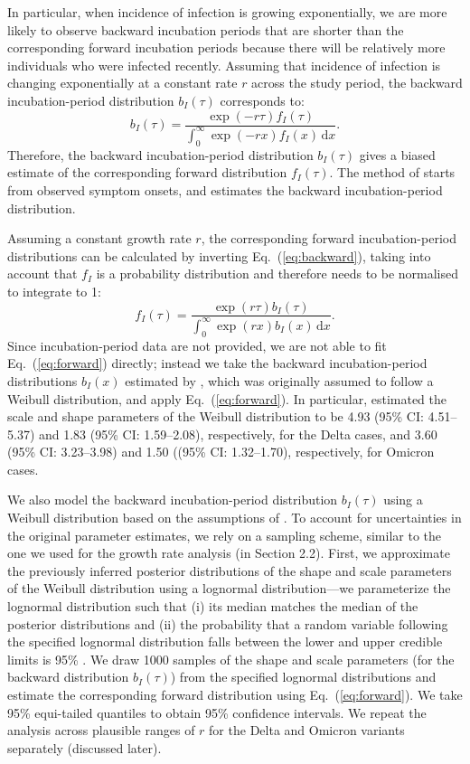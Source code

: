 \documentclass[12pt]{article}
\newcommand{\eref}[1]{Eq.~(\ref{eq:#1})}
\newcommand{\dd}[1]{\ensuremath{\, \mathrm{d}#1}}
\newcommand{\dx}{\dd{x}}
\begin{document}
In particular, when incidence of infection is growing exponentially, we are more likely to observe backward incubation periods that are shorter than the corresponding forward incubation periods because there will be relatively more individuals who were infected recently.
Assuming that incidence of infection is changing exponentially at a constant rate $r$ across the study period, the backward incubation-period distribution $b_I(\tau)$ corresponds to:
\begin{equation}
b_I(\tau) =\frac{ \exp(-r\tau) f_I(\tau)}{\int_0^\infty \exp(-r x) f_I(x)  \dx}.
\label{eq:backward}
\end{equation}
Therefore, the backward incubation-period distribution $b_I(\tau)$ gives a biased estimate of the corresponding forward distribution $f_I(\tau)$.
The method of \cite{backer2020incubation} starts from observed symptom onsets, and estimates the backward incubation-period distribution.


Assuming a constant growth rate $r$, the corresponding forward incubation-period distributions can be calculated by inverting \eref{backward}, taking into account that $f_I$ is a probability distribution and therefore needs to be normalised to integrate to 1:
\begin{equation}
f_I(\tau) = \frac{\exp(r\tau) b_I(\tau) }{\int_0^\infty \exp(rx) b_I(x)\dx}.
\label{eq:forward}
\end{equation}
Since incubation-period data are not provided, we are not able to fit \eref{forward} directly; 
instead we take the backward incubation-period distributions $b_I(x)$ estimated by \cite{backer2021omicron}, which was originally assumed to follow a Weibull distribution, and apply \eref{forward}.
In particular, \cite{backer2021omicron} estimated the scale and shape parameters of the Weibull distribution to be 4.93 (95\% CI: 4.51--5.37) and 1.83 (95\% CI: 1.59--2.08), respectively, for the Delta cases, and 3.60 (95\% CI: 3.23--3.98) and 1.50 ((95\% CI: 1.32--1.70), respectively, for Omicron cases.

We also model the backward incubation-period distribution $b_I(\tau)$ using a Weibull distribution based on the assumptions of \cite{backer2021omicron}.
To account for uncertainties in the original parameter estimates, we rely on a sampling scheme, similar to the one we used for the growth rate analysis (in Section 2.2).
First, we approximate the previously inferred posterior distributions of the shape and scale parameters of the Weibull distribution using a lognormal distribution---we parameterize the lognormal distribution such that (i) its median matches the median of the posterior distributions and (ii) the probability that a random variable following the specified lognormal distribution falls between the lower and upper credible limits is 95\% \citep{park2020reconciling}.
We draw 1000 samples of the shape and scale parameters (for the backward distribution $b_I(\tau)$) from the specified lognormal distributions and estimate the corresponding forward distribution using \eref{forward}.
We take 95\% equi-tailed quantiles to obtain 95\% confidence intervals.
We repeat the analysis across plausible ranges of $r$ for the Delta and Omicron variants separately (discussed later).
\end{document}
